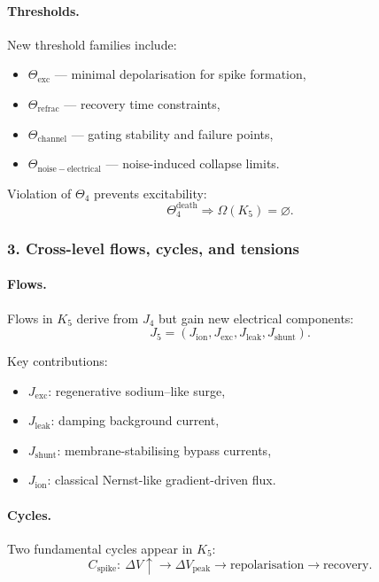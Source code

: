 \paragraph{Thresholds.}
New threshold families include:
\begin{itemize}
  \item $\Theta_{\mathrm{exc}}$ — minimal depolarisation for spike formation,
  \item $\Theta_{\mathrm{refrac}}$ — recovery time constraints,
  \item $\Theta_{\mathrm{channel}}$ — gating stability and failure points,
  \item $\Theta_{\mathrm{noise-electrical}}$ — noise-induced collapse limits.
\end{itemize}

Violation of $\Theta_4$ prevents excitability:
\[
\Theta_4^{\mathrm{death}} \Rightarrow \Omega(K_5)=\varnothing.
\]

\subsubsection{3. Cross-level flows, cycles, and tensions}

\paragraph{Flows.}
Flows in $K_5$ derive from $J_4$ but gain new electrical components:
\[
J_5 = (J_{\mathrm{ion}}, J_{\mathrm{exc}}, J_{\mathrm{leak}}, J_{\mathrm{shunt}}).
\]

Key contributions:
\begin{itemize}
  \item \textbf{$J_{\mathrm{exc}}$}: regenerative sodium–like surge,
  \item \textbf{$J_{\mathrm{leak}}$}: damping background current,
  \item \textbf{$J_{\mathrm{shunt}}$}: membrane-stabilising bypass currents,
  \item \textbf{$J_{\mathrm{ion}}$}: classical Nernst-like gradient-driven flux.
\end{itemize}

\paragraph{Cycles.}
Two fundamental cycles appear in $K_5$:
\[
C_{\mathrm{spike}}:\ \Delta V \uparrow \rightarrow \Delta V_{\mathrm{peak}}
\rightarrow \text{repolarisation} \rightarrow \text{recovery}.
\]


